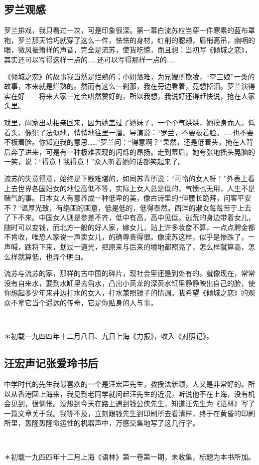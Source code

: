 \subsection{罗兰观感}

\par 罗兰排戏，我只看过一次，可是印象很深。第一幕白流苏应当穿一件寒素的蓝布罩袍，罗兰那天恰巧就穿了这么一件，怯怯的身材，红削的腮颊，眉梢高吊，幽咽的眼，微风振箫样的声音，完全是流苏，使我吃惊，而且想：当初写《倾城之恋》，其实还可以写得这样一点的……还可以写得那样一点的……
\par 《倾城之恋》的故事我当然是烂熟的；小姐落难，为兄嫂所欺凌，“李三娘”一类的故事，本来就是烂熟的。然而有这么一刹那，我在旁边看着，竟想掉泪。罗兰演得实在好——将来大家一定会哄然赞好的，所以我想，我说好还得赶快说，抢在人家头里。
\par 戏里，阖家出动相亲回来，因为她盖过了她妹子，一个个气烘烘，她挨身而入，低着头、像犯了法似地，悄悄地往里一溜。导演说：“罗兰，不要板着脸。……也不要不板着脸。你知道我的意思……”罗兰问：“得意啊？”果然，还是低着头，掩在人背后奔了进来，可是有一种极难表现的闪烁的昂扬。走到幕后，她夸张地摇头晃脑的一笑，说：“得意！我得意！”众人听着她的话都笑起来了。
\par 流苏的失意得意，始终是下贱难堪的，如同苏青所说：“可怜的女人呀！”外表上看上去世界各国妇女的地位高低不等，实际上女人总是低的，气愤也无用，人生不是赌气的事。日本女人有意养成一种低卑的美，像古诗里的“伸腰长跪拜，问客平安不？”温厚光致，有绢画的画意，低是低的，低得泰然。西洋的淑女每每苦于上去了下不来。中国女人则是参差不齐，低中有高，高中见低。逃荒的身边带着女儿，随时可以变钱，而北方一般的好人家，嫁女儿，贴上许多妆奁不算，一点点聘金都不肯收，唯恐人家说一声卖女儿，的确尊贵得很。像流苏这样，似乎是惨跌了，一声喊，跌将下来，划过一道光，把原来与后来的境地都照亮了，怎么样就算高，怎么样就算低，也弄个明白。
\par 流苏与流苏的家，那样的古中国的碎片，现社会里还是到处有的。就像现在，常常没有自来水，要到水缸里去舀水，凸出小黄龙的深黄水缸里静静映出自己的脸，使你想起多少年来井边打水的女人，打水兼照镜子的情调。我希望《倾城之恋》的观众不拿它当个遥远的传奇，它是你贴身的人与事。
\par  
\par ＊初载一九四四年十二月八日、九日上海《力报》，收入《对照记》。


\subsection{汪宏声记张爱玲书后}

\par 中学时代的先生我最喜欢的一个是汪宏声先生，教授法新颖，人又是非常好的。所以从香港回上海来，我见到老同学就问起汪先生的近况，听说他不在上海，没有机会见到，很惆怅。没想到今天在路上遇到钱公侠先生，知道汪先生为《语林》写了一篇文章关于我。我等不及，立刻跟钱先生到印刷所去看清样，终于在黄昏的印刷所里，轰隆轰隆命运性的机器声中，万感交集地写了这几行字。
\par {}
\par  
\par ＊初载一九四四年十二月上海《语林》第一卷第一期，未收集，标题为本书所加。


